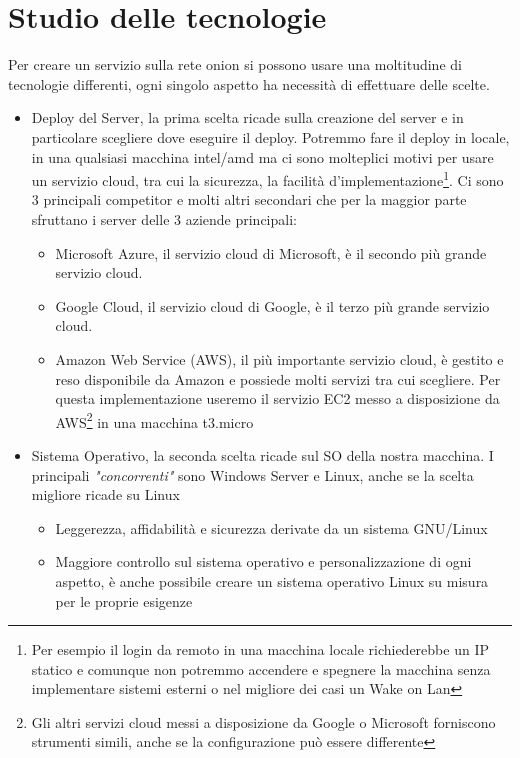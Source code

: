 \newpage
\section{Studio delle tecnologie}
Per creare un servizio sulla rete onion si possono usare una moltitudine di tecnologie differenti, ogni singolo aspetto ha necessità di effettuare delle scelte. \\
\begin{itemize}
    \item Deploy del Server, la prima scelta ricade sulla creazione del server e in particolare scegliere dove eseguire il deploy. Potremmo fare il deploy in locale, in una qualsiasi macchina intel/amd ma ci sono molteplici motivi per usare un servizio cloud, tra cui la sicurezza, la facilità d'implementazione\footnote{Per esempio il login da remoto in una macchina locale richiederebbe un IP statico e comunque non potremmo accendere e spegnere la macchina senza implementare sistemi esterni o nel migliore dei casi un Wake on Lan}. Ci sono 3 principali competitor e molti altri secondari che per la maggior parte sfruttano i server delle 3 aziende principali: 
    \begin{itemize}
        \item Microsoft Azure, il servizio cloud di Microsoft, è il secondo più grande servizio cloud.
        \item Google Cloud, il servizio cloud di Google, è il terzo più grande servizio cloud.
        \item Amazon Web Service (AWS), il più importante servizio cloud, è gestito e reso disponibile da Amazon e possiede molti servizi tra cui scegliere. Per questa implementazione useremo il servizio EC2 messo a disposizione da AWS\footnote{Gli altri servizi cloud messi a disposizione da Google o Microsoft forniscono strumenti simili, anche se la configurazione può essere differente} in una macchina t3.micro
    \end{itemize}
    \item Sistema Operativo, la seconda scelta ricade sul SO della nostra macchina. I principali \emph{"concorrenti"} sono Windows Server e Linux, anche se la scelta migliore ricade su Linux
    \begin{itemize}
        \item Leggerezza, affidabilità e sicurezza derivate da un sistema GNU/Linux
        \item Maggiore controllo sul sistema operativo e personalizzazione di ogni aspetto, è anche possibile creare un sistema operativo Linux su misura per le proprie esigenze

\end{itemize}
\end{itemize}
